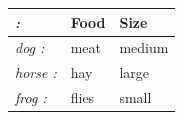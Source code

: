 \documentclass{article}
\begin{document}
\begin{tabular}{>{\itshape}l<{:} *{2}{l}}
\toprule
\multicolumn{1}{l}{Animal} & Food & Size \\
\midrule
dog & meat & medium \\
horse & hay & large \\
frog & flies & small \\
\bottomrule
\end{tabular}
\end{document}
